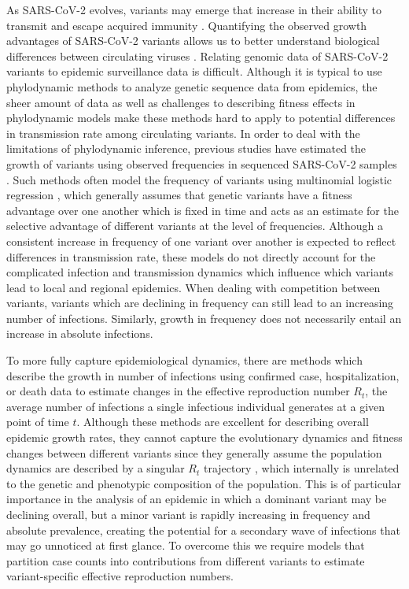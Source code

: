 As SARS-CoV-2 evolves, variants may emerge that increase in their ability to transmit and escape acquired immunity \cite{tao2021biological}.
Quantifying the observed growth advantages of SARS-CoV-2 variants allows us to better understand biological differences between circulating viruses \cite{tegally2021detection, davies2021estimated}.
Relating genomic data of SARS-CoV-2 variants to epidemic surveillance data is difficult.
Although it is typical to use phylodynamic methods to analyze genetic sequence data from epidemics, the sheer amount of data as well as challenges to describing fitness effects in phylodynamic models make these methods hard to apply to potential differences in transmission rate among circulating variants.
In order to deal with the limitations of phylodynamic inference, previous studies have estimated the growth of variants using observed frequencies in sequenced SARS-CoV-2 samples \cite{Annavajhala2021, faria2021genomics, obermeyer2022analysis, Ito2021}.
Such methods often model the frequency of variants using multinomial logistic regression \cite{Annavajhala2021, obermeyer2022analysis}, which generally assumes that genetic variants have a fitness advantage over one another which is fixed in time and acts as an estimate for the selective advantage of different variants at the level of frequencies.
Although a consistent increase in frequency of one variant over another is expected to reflect differences in transmission rate, these models do not directly account for the complicated infection and transmission dynamics which influence which variants lead to local and regional epidemics.
When dealing with competition between variants, variants which are declining in frequency can still lead to an increasing number of infections.
Similarly, growth in frequency does not necessarily entail an increase in absolute infections.

To more fully capture epidemiological dynamics, there are methods which describe the growth in number of infections using confirmed case, hospitalization, or death data to estimate changes in the effective reproduction number $R_{t}$, the average number of infections a single infectious individual generates at a given point of time $t$.
Although these methods are excellent for describing overall epidemic growth rates, they cannot capture the evolutionary dynamics and fitness changes between different variants since they generally assume the population dynamics are described by a singular $R_{t}$ trajectory \cite{Cori2013, Abbott2020}, which internally is unrelated to the genetic and phenotypic composition of the population.
This is of particular importance in the analysis of an epidemic in which a dominant variant may be declining overall, but a minor variant is rapidly increasing in frequency and absolute prevalence, creating the potential for a secondary wave of infections that may go unnoticed at first glance.
To overcome this we require models that partition case counts into contributions from different variants to estimate variant-specific effective reproduction numbers.

